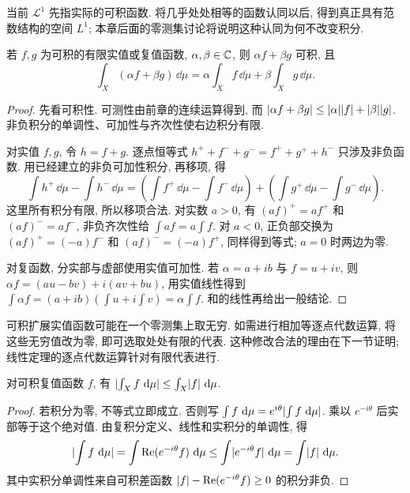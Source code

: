 当前 $\mathcal L^1$ 先指实际的可积函数. 将几乎处处相等的函数认同以后, 得到真正具有范数结构的空间 $L^1$; 本章后面的零测集讨论将说明这种认同为何不改变积分.

\begin{theorem}\label{ra:c2:linearity}
若 $f,g$ 为可积的有限实值或复值函数, $\alpha,\beta\in\mathbb C$, 则 $\alpha f+\beta g$ 可积, 且
\[
 \int_X(\alpha f+\beta g)\,\dd\mu
 =\alpha\int_Xf\,\dd\mu+\beta\int_Xg\,\dd\mu.
\]
\end{theorem}
\begin{proof}
先看可积性. 可测性由前章的连续运算得到, 而 $\lvert \alpha f+\beta g\rvert\le\lvert \alpha\rvert\lvert f\rvert+\lvert \beta\rvert\lvert g\rvert$. 非负积分的单调性、可加性与齐次性使右边积分有限.

对实值 $f,g$, 令 $h=f+g$. 逐点恒等式 $h^++f^-+g^-=f^++g^++h^-$ 只涉及非负函数. 用已经建立的非负可加性积分, 再移项, 得
\[
 \int h^+\,\dd\mu-\int h^-\,\dd\mu
 =\left(\int f^+\,\dd\mu-\int f^-\,\dd\mu\right)
 +\left(\int g^+\,\dd\mu-\int g^-\,\dd\mu\right).
\]
这里所有积分有限, 所以移项合法. 对实数 $a>0$, 有 $(af)^+=af^+$ 和 $(af)^-=af^-$, 非负齐次性给 $\int af=a\int f$. 对 $a<0$, 正负部交换为 $(af)^+=(-a)f^-$ 和 $(af)^-=(-a)f^+$, 同样得到等式; $a=0$ 时两边为零.

对复函数, 分实部与虚部使用实值可加性. 若 $\alpha=a+ib$ 与 $f=u+iv$, 则 $\alpha f=(au-bv)+i(av+bu)$, 用实值线性得到 $\int\alpha f=(a+ib)(\int u+i\int v)=\alpha\int f$. 和的线性再给出一般结论.
\end{proof}
可积扩展实值函数可能在一个零测集上取无穷. 如需进行相加等逐点代数运算, 将这些无穷值改为零, 即可选取处处有限的代表. 这种修改合法的理由在下一节证明; 线性定理的逐点代数运算针对有限代表进行.

\begin{theorem}[积分的三角不等式]\label{ra:c2:triangle}
对可积复值函数 $f$, 有 $\lvert \int_Xf\,\,\mathrm d\mu\rvert\le\int_X\lvert f\rvert\,\,\mathrm d\mu$.
\end{theorem}
\begin{proof}
若积分为零, 不等式立即成立. 否则写 $\int f\,\,\mathrm d\mu=e^{i\theta}\lvert \int f\,\,\mathrm d\mu\rvert$. 乘以 $e^{-i\theta}$ 后实部等于这个绝对值. 由复积分定义、线性和实积分的单调性, 得
\[
 \lvert \int f\,\,\mathrm d\mu\rvert
 =\int\operatorname{Re}(e^{-i\theta}f)\,\,\mathrm d\mu
 \le\int\lvert e^{-i\theta}f\rvert\,\,\mathrm d\mu
 =\int\lvert f\rvert\,\,\mathrm d\mu.
\]
其中实积分单调性来自可积差函数 $\lvert f\rvert-\operatorname{Re}(e^{-i\theta}f)\ge0$ 的积分非负.
\end{proof}

